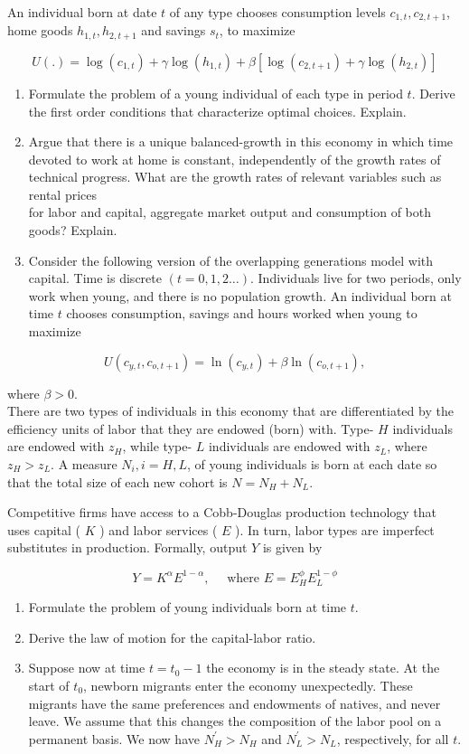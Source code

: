 \documentclass[10pt]{article}
\begin{document}
An individual born at date $t$ of any type chooses consumption levels $c_{1, t}, c_{2, t+1}$, home goods $h_{1, t}, h_{2, t+1}$ and savings $s_{t}$, to maximize

$$
U(.)=\log \left(c_{1, t}\right)+\gamma \log \left(h_{1, t}\right)+\beta\left[\log \left(c_{2, t+1}\right)+\gamma \log \left(h_{2, t}\right)\right]
$$

\begin{enumerate}
  \item Formulate the problem of a young individual of each type in period $t$. Derive the first order conditions that characterize optimal choices. Explain.
  \item Argue that there is a unique balanced-growth in this economy in which time devoted to work at home is constant, independently of the growth rates of technical progress. What are the growth rates of relevant variables such as rental prices\\
for labor and capital, aggregate market output and consumption of both goods? Explain.
  \item Consider the following version of the overlapping generations model with capital. Time is discrete $(t=0,1,2 \ldots)$. Individuals live for two periods, only work when young, and there is no population growth. An individual born at time $t$ chooses consumption, savings and hours worked when young to maximize
\end{enumerate}

$$
U\left(c_{y, t}, c_{o, t+1}\right)=\ln \left(c_{y, t}\right)+\beta \ln \left(c_{o, t+1}\right),
$$

where $\beta>0$.\\
There are two types of individuals in this economy that are differentiated by the efficiency units of labor that they are endowed (born) with. Type- $H$ individuals are endowed with $z_{H}$, while type- $L$ individuals are endowed with $z_{L}$, where $z_{H}>z_{L}$. A measure $N_{i}, i=H, L$, of young individuals is born at each date so that the total size of each new cohort is $N=N_{H}+N_{L}$.

Competitive firms have access to a Cobb-Douglas production technology that uses capital ( $K$ ) and labor services ( $E$ ). In turn, labor types are imperfect substitutes in production. Formally, output $Y$ is given by

$$
Y=K^{\alpha} E^{1-\alpha}, \quad \text { where } E=E_{H}^{\phi} E_{L}^{1-\phi}
$$

\begin{enumerate}
  \item Formulate the problem of young individuals born at time $t$.
  \item Derive the law of motion for the capital-labor ratio.
  \item Suppose now at time $t=t_{0}-1$ the economy is in the steady state. At the start of $t_{0}$, newborn migrants enter the economy unexpectedly. These migrants have the same preferences and endowments of natives, and never leave. We assume that this changes the composition of the labor pool on a permanent basis. We now have $N_{H}^{\prime}>N_{H}$ and $N_{L}^{\prime}>N_{L}$, respectively, for all $t$.
\end{enumerate}
\end{document}
